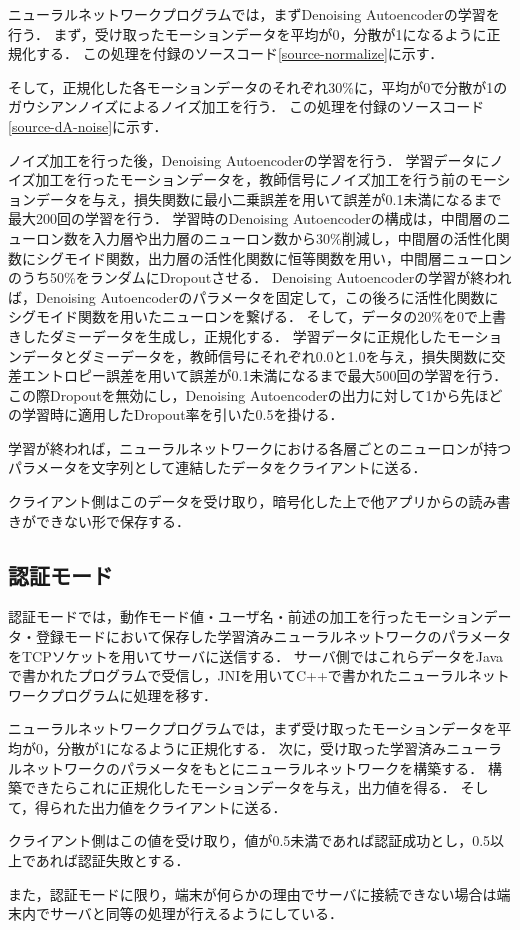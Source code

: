 ニューラルネットワークプログラムでは，まずDenoising Autoencoderの学習を行う．
まず，受け取ったモーションデータを平均が0，分散が1になるように正規化する．
この処理を付録のソースコード\ref{source-normalize}に示す．

そして，正規化した各モーションデータのそれぞれ30\%に，平均が0で分散が1のガウシアンノイズによるノイズ加工を行う．
この処理を付録のソースコード\ref{source-dA-noise}に示す．

ノイズ加工を行った後，Denoising Autoencoderの学習を行う．
学習データにノイズ加工を行ったモーションデータを，教師信号にノイズ加工を行う前のモーションデータを与え，損失関数に最小二乗誤差を用いて誤差が0.1未満になるまで最大200回の学習を行う．
学習時のDenoising Autoencoderの構成は，中間層のニューロン数を入力層や出力層のニューロン数から30\%削減し，中間層の活性化関数にシグモイド関数，出力層の活性化関数に恒等関数を用い，中間層ニューロンのうち50\%をランダムにDropoutさせる．
Denoising Autoencoderの学習が終われば，Denoising Autoencoderのパラメータを固定して，この後ろに活性化関数にシグモイド関数を用いたニューロンを繋げる．
そして，データの20\%を0で上書きしたダミーデータを生成し，正規化する．
学習データに正規化したモーションデータとダミーデータを，教師信号にそれぞれ0.0と1.0を与え，損失関数に交差エントロピー誤差を用いて誤差が0.1未満になるまで最大500回の学習を行う．
この際Dropoutを無効にし，Denoising Autoencoderの出力に対して1から先ほどの学習時に適用したDropout率を引いた0.5を掛ける．

学習が終われば，ニューラルネットワークにおける各層ごとのニューロンが持つパラメータを文字列として連結したデータをクライアントに送る．

クライアント側はこのデータを受け取り，暗号化した上で他アプリからの読み書きができない形で保存する．

\subsection{認証モード}
認証モードでは，動作モード値・ユーザ名・前述の加工を行ったモーションデータ・登録モードにおいて保存した学習済みニューラルネットワークのパラメータをTCPソケットを用いてサーバに送信する．
サーバ側ではこれらデータをJavaで書かれたプログラムで受信し，JNIを用いてC++で書かれたニューラルネットワークプログラムに処理を移す．

ニューラルネットワークプログラムでは，まず受け取ったモーションデータを平均が0，分散が1になるように正規化する．
次に，受け取った学習済みニューラルネットワークのパラメータをもとにニューラルネットワークを構築する．
構築できたらこれに正規化したモーションデータを与え，出力値を得る．
そして，得られた出力値をクライアントに送る．

クライアント側はこの値を受け取り，値が0.5未満であれば認証成功とし，0.5以上であれば認証失敗とする．

また，認証モードに限り，端末が何らかの理由でサーバに接続できない場合は端末内でサーバと同等の処理が行えるようにしている．
